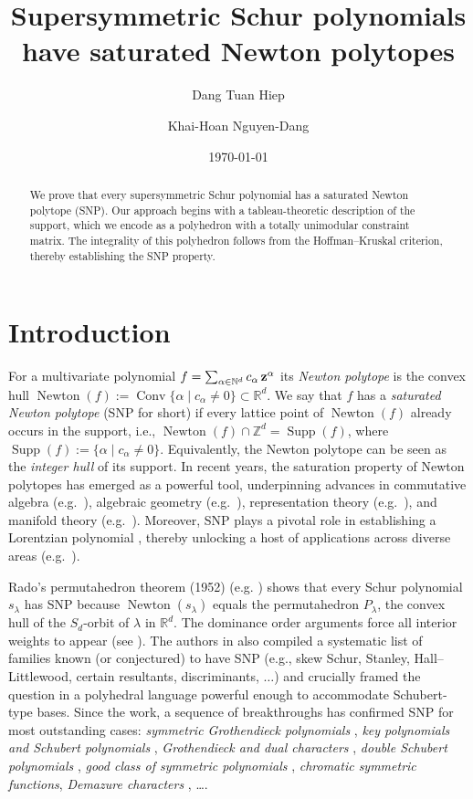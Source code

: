 \documentclass[12pt,a4paper,oneside]{amsart}
\title{Supersymmetric Schur polynomials have saturated Newton polytopes}
\author{Dang Tuan Hiep}
\author{Khai-Hoan Nguyen-Dang}
\date{\today}
\theoremstyle{definition}
\DeclareMathOperator{\Supp}{Supp}
\DeclareMathOperator{\Conv}{Conv}
\DeclareMathOperator{\Newton}{Newton}
\newcommand{\Z}{\mathbb{Z}}
\newcommand{\R}{\mathbb{R}}
\begin{document}
\begin{abstract}
    We prove that every supersymmetric Schur polynomial has a saturated Newton polytope (SNP). Our approach begins with a tableau-theoretic description of the support, which we encode as a polyhedron with a totally unimodular constraint matrix. The integrality of this polyhedron follows from the Hoffman–Kruskal criterion, thereby establishing the SNP property. 
\end{abstract}
\maketitle
\tableofcontents

\section{Introduction}
For a multivariate polynomial \(f=\sum_{\alpha\in\Bbb N^{d}}c_{\alpha}\,{\mathbf z}^{\alpha}\) its \emph{Newton polytope} is the convex hull \(
   \Newton(f):=\Conv\{\alpha\mid c_{\alpha}\neq0\}\subset\R^{d}.
\) We say that \(f\) has a \emph{saturated Newton polytope} (SNP for short) if every lattice point of \(\Newton(f)\) already occurs in the support, i.e., \(\Newton(f)\cap\Z^{d}=\Supp(f)\), where \(\Supp(f):=\{\alpha\mid c_{\alpha}\neq0\}.\) Equivalently, the Newton polytope can be seen as the \emph{integer hull} of its support. In recent years, the saturation property of Newton polytopes has emerged as a powerful tool, underpinning advances in commutative algebra (e.g.\ \cite{CCLMZ20,CCC23,HNP25}), algebraic geometry (e.g.\ \cite{Fei23,CLM24}), representation theory (e.g.\ \cite{FMD18,MS22,BJK24,BJK24b}), and manifold theory (e.g.\ \cite{CC24}).  Moreover, SNP plays a pivotal role in establishing a Lorentzian polynomial \cite{BH20}, thereby unlocking a host of applications across diverse areas (e.g.\ \cite{HMMS22,MMS24,ATZ24,KMD25}).

Rado’s permutahedron theorem (1952) (e.g. \cite{Ra52}) shows that every Schur polynomial \(s_{\lambda}\) has SNP because \(\Newton(s_{\lambda})\) equals the permutahedron \(P_{\lambda}\), the convex hull of the $S_d$-orbit of $\lambda$ in $\R^d$. The dominance order arguments force all interior weights to appear (see \cite{MTY19}). The authors in \cite{MTY19} also compiled a systematic list of families known (or conjectured) to have SNP (e.g., skew Schur, Stanley, Hall–Littlewood, certain resultants, discriminants, $\dots$) and crucially framed the question in a polyhedral language powerful enough to accommodate Schubert‐type bases. Since the work, a sequence of breakthroughs has confirmed SNP for most outstanding cases: \emph{symmetric Grothendieck polynomials} \cite{EY17}, \emph{key polynomials and Schubert polynomials} \cite{FMD18}, \emph{Grothendieck and dual characters} \cite{HMMS22}, \emph{double Schubert polynomials} \cite{CCMM23}, \emph{good class of symmetric polynomials} \cite{NNDD23}, \emph{chromatic symmetric functions}\cite{MMS24}, \emph{Demazure characters} \cite{BJK24}, \ldots.
\end{document}
